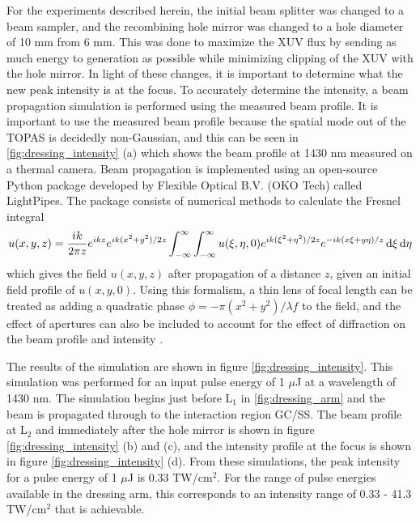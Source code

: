 For the experiments described herein, the initial beam splitter was changed to a beam sampler, and the recombining hole mirror was changed to a hole diameter of 10 mm from 6 mm.  This was done to maximize the XUV flux by sending as much energy to generation as possible while minimizing clipping of the XUV with the hole mirror.  In light of these changes, it is important to determine what the new peak intensity is at the focus.  To accurately determine the intensity, a beam propagation simulation is performed using the measured beam profile.  It is important to use the measured beam profile because the spatial mode out of the TOPAS is decidedly non-Gaussian, and this can be seen in \ref{fig:dressing_intensity} (a) which shows the beam profile at 1430 nm measured on a thermal camera.  Beam propagation is implemented using an open-source Python package developed by Flexible Optical B.V. (OKO Tech) called LightPipes.  The package consists of numerical methods to calculate the Fresnel integral
\begin{equation}
\label{fresnel_integral_0}
u(x,y,z)=\frac{i k}{2\pi z}e^{i k z}e^{i k (x^2+y^2)/2z}\int_{-\infty}^{\infty}\int_{-\infty}^{\infty}u(\xi,\eta,0) e^{ik(\xi^{2}+\eta^{2})/2z} e^{-ik(x\xi + y\eta)/z} \mathop{}\!\mathrm{d}\xi\mathop{}\!\mathrm{d}\eta
\end{equation}
which gives the field $u(x,y,z)$ after propagation of a distance $z$, given an initial field profile of $u(x,y,0)$.  Using this formalism, a thin lens of focal length can be treated as adding a quadratic phase $\phi=-\pi(x^2+y^2)/\lambda f$ to the field, and the effect of apertures can also be included to account for the effect of diffraction on the beam profile and intensity \cite{goodmanIntroductionFourierOptics2005}.

The results of the simulation are shown in figure \ref{fig:dressing_intensity}.  This simulation was performed for an input pulse energy of 1 $\mu$J at a wavelength of 1430 nm. The simulation begins just before L$_1$ in \ref{fig:dressing_arm} and the beam is propagated through to the interaction region GC/SS.  The beam profile at L$_2$ and immediately after the hole mirror is shown in figure \ref{fig:dressing_intensity} (b) and (c), and the intensity profile at the focus is shown in figure \ref{fig:dressing_intensity} (d).  From these simulations, the peak intensity for a pulse energy of 1 $\mu$J is 0.33 TW/cm$^2$. For the range of pulse energies available in the dressing arm, this corresponds to an intensity range of 0.33 - 41.3 TW/cm$^2$ that is achievable.

